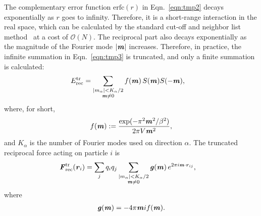 \documentclass[aps,pre,preprint,unsortedaddress]{revtex4}
\renewcommand{\v}[1]{\textbf{\textit{#1}}}
\begin{document}
The complementary error function $\textrm{erfc}(r)$ in
Eqn.~\eqref{eqn:tmp2} decays exponentially as $r$ goes to infinity.
Therefore, it is a short-range interaction in the real space, which
can be calculated by the standard cut-off and neighbor list
method~\cite{frenkel02b} at a cost of $\mathcal O(N)$.  The reciprocal
part also decays exponentially as the magnitude of the Fourier mode
$\vert\v m\vert$ increases. Therefore, in practice, the infinite
summation in Eqn.~\eqref{eqn:tmp3} is truncated, and only a finite
summation is calculated:
\begin{align}\label{eqn:tmp6}
  E^{\textrm{tr}}_{\textrm{rec}} & =
  \sum_{
    \begin{subarray}{c}
      \vert m_\alpha\vert < K_\alpha/2\\
      \v m\neq 0
    \end{subarray}}
  f(\v m)\, S(\v m) S(-\v m),
\end{align}
where, for short,
\begin{align}
  f(\v m) := \frac{\exp(-\pi^2 \v m^2 / \beta^2)}{2\pi V \v m^2},
\end{align}
and $K_\alpha$ is the number of Fourier modes used on direction
$\alpha$.  The truncated reciprocal force acting on particle $i$ is
\begin{align}
  \v F^{\textrm{tr}}_{\textrm{rec}}(\v r_i)
  \label{eqn:tmp8}
  &= 
  \sum_j   q_iq_j
  \sum_{
    \begin{subarray}{c}
      \vert m_\alpha\vert < K_\alpha/2\\
      \v m\neq 0
    \end{subarray}}
  \v g(\v m) \,
  e^{2\pi i\v m\cdot\v r_{ij}},
\end{align}
where
\begin{align}
  \v g(\v m) = -4 \pi \v m i f(\v m).
\end{align}


\end{document}
